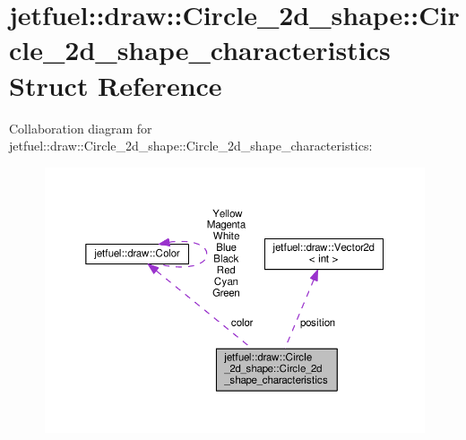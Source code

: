 \hypertarget{structjetfuel_1_1draw_1_1Circle__2d__shape_1_1Circle__2d__shape__characteristics}{}\section{jetfuel\+:\+:draw\+:\+:Circle\+\_\+2d\+\_\+shape\+:\+:Circle\+\_\+2d\+\_\+shape\+\_\+characteristics Struct Reference}
\label{structjetfuel_1_1draw_1_1Circle__2d__shape_1_1Circle__2d__shape__characteristics}


Collaboration diagram for jetfuel\+:\+:draw\+:\+:Circle\+\_\+2d\+\_\+shape\+:\+:Circle\+\_\+2d\+\_\+shape\+\_\+characteristics\+:\nopagebreak
\begin{figure}[H]
\begin{center}
\leavevmode
\includegraphics[width=350pt]{structjetfuel_1_1draw_1_1Circle__2d__shape_1_1Circle__2d__shape__characteristics__coll__graph}
\end{center}
\end{figure}
